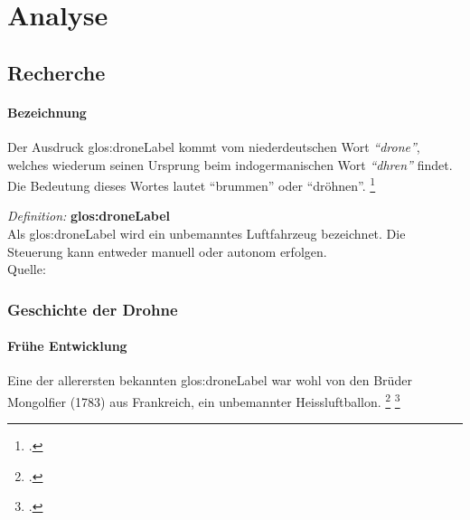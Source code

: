 \chapter{Analyse}

\section{Recherche}
\label{sec:recherche}

\subsubsection{Bezeichnung}
Der Ausdruck \gls{glos:droneLabel} kommt vom niederdeutschen Wort \textit{"`drone"'}, welches wiederum seinen Ursprung beim indogermanischen Wort \textit{"`dhren"'} findet. Die Bedeutung dieses Wortes lautet "`brummen"' oder "`dröhnen"'. \footcite{Geschichte_der_Drohne_-_Nachrichten_Print_-_DIE_WELT_-_Wissen_Print_DW_-_DIE_WELT_2015-03-21}

\begin{framed}
	\textit{Definition: }\textbf{\gls{glos:droneLabel}}\\
	Als \gls{glos:droneLabel} wird ein unbemanntes Luftfahrzeug bezeichnet. Die Steuerung kann entweder manuell oder autonom erfolgen.\\
	Quelle:
\end{framed}

\subsection{Geschichte der Drohne}

\subsubsection{Frühe Entwicklung}
Eine der allerersten bekannten \gls{glos:droneLabel} war wohl von den Brüder Mongolfier (1783) aus Frankreich, ein unbemannter Heissluftballon. \footcite{Kleine_Geschichte_der_Drohnen_-_Nachrichten_Print_-_WELT_KOMPAKT_-_Lifestyle_-_DIE_WELT_2015-03-21}
\footcite{Unbemannte_Luftfahrt__Wikipedia_2015-03-22}

